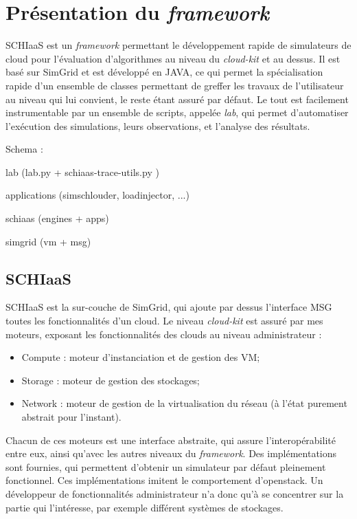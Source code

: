 \documentclass[parallelisme]{compas2017}
\begin{document}
\section{Présentation du \textit{framework}}

SCHIaaS est un \textit{framework} permettant le développement rapide de simulateurs 
de cloud pour l'évaluation d'algorithmes au niveau du \textit{cloud-kit} et au dessus.
Il est basé sur SimGrid et est développé en JAVA, ce qui permet la spécialisation 
rapide d'un ensemble de classes permettant de greffer les travaux de l'utilisateur au 
niveau qui lui convient, le reste étant assuré par défaut.
Le tout est facilement instrumentable par un ensemble de scripts, appelée \emph{lab},
qui permet d'automatiser l'exécution des simulations, leurs observations, et l'analyse
des résultats.

Schema :

lab (lab.py + schiaas-trace-utils.py )

applications (simschlouder, loadinjector, ...)

schiaas (engines + apps)

simgrid (vm + msg)


\subsection{SCHIaaS}

SCHIaaS est la sur-couche de SimGrid, qui ajoute par dessus l'interface MSG toutes les 
fonctionnalités d'un cloud. 
Le niveau \textit{cloud-kit} est assuré par mes moteurs, exposant les fonctionnalités 
des clouds au niveau administrateur :
\begin{itemize}
 \item Compute : moteur d'instanciation et de gestion des VM;
 \item Storage : moteur de gestion des stockages;
 \item Network : moteur de gestion de la virtualisation du réseau (à l'état purement abstrait pour l'instant).
\end{itemize}

Chacun de ces moteurs est une interface abstraite, qui assure l'interopérabilité entre eux, 
ainsi qu'avec les autres niveaux du \textit{framework}. Des implémentations sont fournies, qui 
permettent d'obtenir un simulateur par défaut pleinement fonctionnel. Ces implémentations 
imitent le comportement d'openstack. Un développeur de fonctionnalités administrateur n'a donc 
qu'à se concentrer sur la partie qui l'intéresse, par exemple différent systèmes de stockages.
\end{document}
